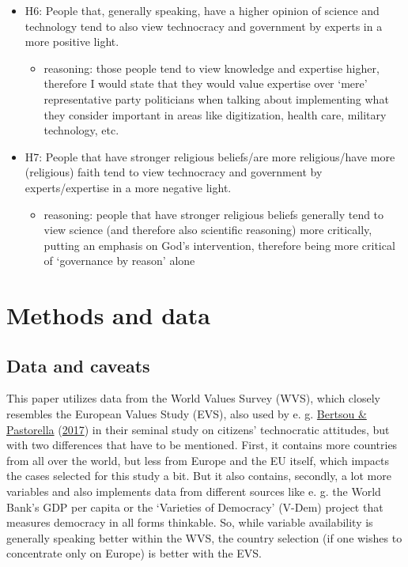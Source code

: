 \documentclass[
  12pt,
  english,
]{article}
\providecommand{\tightlist}{%
  \setlength{\itemsep}{0pt}\setlength{\parskip}{0pt}}
\begin{document}
\begin{itemize}
\tightlist
\item
  H6: People that, generally speaking, have a higher opinion of science
  and technology tend to also view technocracy and government by experts
  in a more positive light.

  \begin{itemize}
  \tightlist
  \item
    reasoning: those people tend to view knowledge and expertise higher,
    therefore I would state that they would value expertise over `mere'
    representative party politicians when talking about implementing
    what they consider important in areas like digitization, health
    care, military technology, etc.
  \end{itemize}
\item
  H7: People that have stronger religious beliefs/are more
  religious/have more (religious) faith tend to view technocracy and
  government by experts/expertise in a more negative light.

  \begin{itemize}
  \tightlist
  \item
    reasoning: people that have stronger religious beliefs generally
    tend to view science (and therefore also scientific reasoning) more
    critically, putting an emphasis on God's intervention, therefore
    being more critical of `governance by reason' alone
  \end{itemize}
\end{itemize}

\hypertarget{methods-and-data}{%
\section{Methods and data}\label{methods-and-data}}

\hypertarget{data-and-caveats}{%
\subsection{Data and caveats}\label{data-and-caveats}}

This paper utilizes data from the World Values Survey (WVS), which
closely resembles the European Values Study (EVS), also used by e. g.
\protect\hyperlink{ref-bertsou2017technocratic}{Bertsou \& Pastorella}
(\protect\hyperlink{ref-bertsou2017technocratic}{2017}) in their seminal
study on citizens' technocratic attitudes, but with two differences that
have to be mentioned. First, it contains more countries from all over
the world, but less from Europe and the EU itself, which impacts the
cases selected for this study a bit. But it also contains, secondly, a
lot more variables and also implements data from different sources like
e. g. the World Bank's GDP per capita or the `Varieties of Democracy'
(V-Dem) project that measures democracy in all forms thinkable. So,
while variable availability is generally speaking better within the WVS,
the country selection (if one wishes to concentrate only on Europe) is
better with the EVS.
\end{document}
